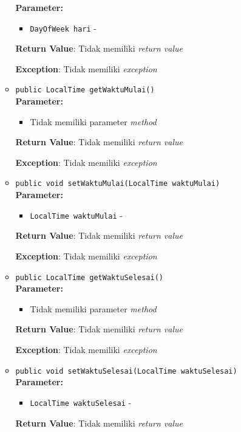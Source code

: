 \documentclass{article}
\begin{document}
\begin{enumerate}
\begin{itemize}
\textbf{Parameter:}\begin{itemize}
\item \texttt{DayOfWeek hari} - 
\end{itemize}
\textbf{Return Value}: Tidak memiliki \textit{return value}

\textbf{Exception}: Tidak memiliki \textit{exception}

\item \texttt{public LocalTime getWaktuMulai()}\\ 


\textbf{Parameter:}\begin{itemize}
\item Tidak memiliki parameter \textit{method}
\end{itemize}
\textbf{Return Value}: Tidak memiliki \textit{return value}

\textbf{Exception}: Tidak memiliki \textit{exception}

\item \texttt{public void setWaktuMulai(LocalTime waktuMulai)}\\ 


\textbf{Parameter:}\begin{itemize}
\item \texttt{LocalTime waktuMulai} - 
\end{itemize}
\textbf{Return Value}: Tidak memiliki \textit{return value}

\textbf{Exception}: Tidak memiliki \textit{exception}

\item \texttt{public LocalTime getWaktuSelesai()}\\ 


\textbf{Parameter:}\begin{itemize}
\item Tidak memiliki parameter \textit{method}
\end{itemize}
\textbf{Return Value}: Tidak memiliki \textit{return value}

\textbf{Exception}: Tidak memiliki \textit{exception}

\item \texttt{public void setWaktuSelesai(LocalTime waktuSelesai)}\\ 


\textbf{Parameter:}\begin{itemize}
\item \texttt{LocalTime waktuSelesai} - 
\end{itemize}
\textbf{Return Value}: Tidak memiliki \textit{return value}


\end{itemize}
\end{enumerate}
\end{document}
